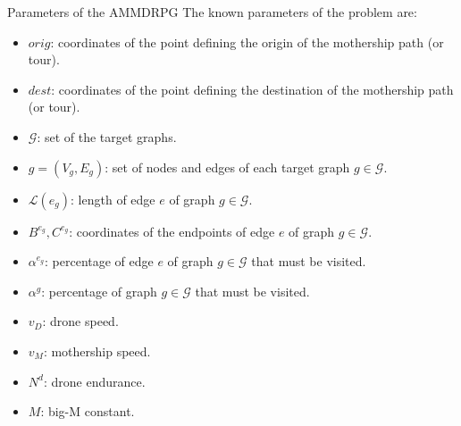 \documentclass[slidestop,usepdftitle=false,10pt]{beamer}
\begin{document}
	\begin{frame}{Parameters of the AMMDRPG}
	\footnotesize
	The known parameters of the problem are:
	\begin{itemize}
	    \item $orig$: coordinates of the point defining the origin of the mothership path (or tour).
        \item $dest$: coordinates of the point defining the destination of the mothership path (or tour).
        \item $\mathcal{G}$: set of the target graphs.\\
        \item $g = (V_g, E_g)$: set of nodes and edges of each target graph $g \in \mathcal{G}$.
        \item $\mathcal{L}(e_g)$: length of edge $e$ of graph $g \in \mathcal{G}$.
        \item $B^{e_g}, C^{e_g}$: coordinates of the endpoints of edge $e$ of graph $g \in \mathcal{G}$.
        \item $\alpha^{e_g}$: percentage of edge $e$ of graph $g \in \mathcal{G}$ that must be visited.
        \item $\alpha^g$: percentage of graph $g \in \mathcal{G}$ that must be visited.
        \item $v_D$: drone speed.
        \item $v_M$: mothership speed.
        \item $N^d$: drone endurance.
        \item $M$: big-M constant.
    \end{itemize}
	\end{frame}
	
\end{document}
